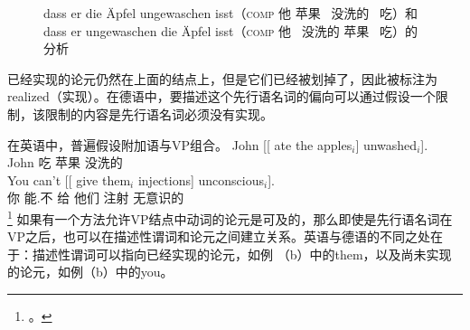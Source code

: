\begin{figure}
\caption{dass er die Äpfel ungewaschen isst（\textsc{comp} 他  苹果 \, 没洗的 \, 吃）和dass er ungewaschen die Äpfel isst（\textsc{comp} 他 \, 没洗的  苹果 \, 吃）的分析}\label{anal-er-die-frau-nackt-sieht}
\end{figure}%
已经实现的论元仍然在上面的结点上，但是它们已经被划掉了，因此被标注为realized（实现）。在德语中，要描述这个先行语名词的偏向可以通过假设一个限制，该限制的内容是先行语名词必须没有实现。
\pagebreak

在英语中，普遍假设附加语与VP组合。
\eal
\ex 
\gll John [[ ate the apples$_i$] unwashed$_i$].\\
	John {} 吃  苹果 没洗的\\
\ex 
\gll You can't [[ give them$_i$ injections] unconscious$_i$].\\
	你 能.不 {} 给 他们 注射 无意识的\\
\footnote{%
 。
}
\zl
如果有一个方法允许VP结点中动词的论元是可及的，那么即使是先行语名词在VP之后，也可以在描述性谓词和论元之间建立关系。英语与德语的不同之处在于：描述性谓词可以指向已经实现的论元，如例 （b）中的them，以及尚未实现的论元，如例（b）中的you。

